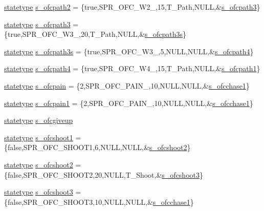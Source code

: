 \begin{DoxyCompactItemize}
\item 
\hyperlink{structstatestruct}{statetype} \hyperlink{WL__ACT2_8C_a90e98fd84e585f813ddd1a343605cacc}{s\_\-ofcpath2} = \{true,SPR\_\-OFC\_\-W2\_,15,T\_\-Path,NULL,\&\hyperlink{WL__ACT2_8C_af823cd8629d121bbcd71e39e9dd61bf6}{s\_\-ofcpath3}\}
\item 
\hyperlink{structstatestruct}{statetype} \hyperlink{WL__ACT2_8C_af823cd8629d121bbcd71e39e9dd61bf6}{s\_\-ofcpath3} = \{true,SPR\_\-OFC\_\-W3\_,20,T\_\-Path,NULL,\&\hyperlink{WL__ACT2_8C_a6601566ef7b73539b95e3bdc9d8de72f}{s\_\-ofcpath3s}\}
\item 
\hyperlink{structstatestruct}{statetype} \hyperlink{WL__ACT2_8C_a6601566ef7b73539b95e3bdc9d8de72f}{s\_\-ofcpath3s} = \{true,SPR\_\-OFC\_\-W3\_,5,NULL,NULL,\&\hyperlink{WL__ACT2_8C_a3b37f3a468ab697ce571f0ec399c8386}{s\_\-ofcpath4}\}
\item 
\hyperlink{structstatestruct}{statetype} \hyperlink{WL__ACT2_8C_a3b37f3a468ab697ce571f0ec399c8386}{s\_\-ofcpath4} = \{true,SPR\_\-OFC\_\-W4\_,15,T\_\-Path,NULL,\&\hyperlink{WL__ACT2_8C_a29992c9719ce8a66a95f69e0833eeb07}{s\_\-ofcpath1}\}
\item 
\hyperlink{structstatestruct}{statetype} \hyperlink{WL__ACT2_8C_acd795aa968a47e77109d917e6539e2b1}{s\_\-ofcpain} = \{2,SPR\_\-OFC\_\-PAIN\_,10,NULL,NULL,\&\hyperlink{WL__DEF_8H_a44b7e077d3373fd8075bb6acdcfcd0df}{s\_\-ofcchase1}\}
\item 
\hyperlink{structstatestruct}{statetype} \hyperlink{WL__ACT2_8C_aa5e50151f6cdf0e49996440f74ad691d}{s\_\-ofcpain1} = \{2,SPR\_\-OFC\_\-PAIN\_,10,NULL,NULL,\&\hyperlink{WL__DEF_8H_a44b7e077d3373fd8075bb6acdcfcd0df}{s\_\-ofcchase1}\}
\item 
\hyperlink{structstatestruct}{statetype} \hyperlink{WL__ACT2_8C_a8bf52496d133d46dd7ec3ab0f367a44f}{s\_\-ofcgiveup}
\item 
\hyperlink{structstatestruct}{statetype} \hyperlink{WL__ACT2_8C_a5423e1b82c361ca71a288cbd7b071c1a}{s\_\-ofcshoot1} = \{false,SPR\_\-OFC\_\-SHOOT1,6,NULL,NULL,\&\hyperlink{WL__ACT2_8C_a8df7d062c99ab885343b17ebcc53df1b}{s\_\-ofcshoot2}\}
\item 
\hyperlink{structstatestruct}{statetype} \hyperlink{WL__ACT2_8C_a8df7d062c99ab885343b17ebcc53df1b}{s\_\-ofcshoot2} = \{false,SPR\_\-OFC\_\-SHOOT2,20,NULL,T\_\-Shoot,\&\hyperlink{WL__ACT2_8C_aa6111d890bf4a25175072559ff7afc10}{s\_\-ofcshoot3}\}
\item 
\hyperlink{structstatestruct}{statetype} \hyperlink{WL__ACT2_8C_aa6111d890bf4a25175072559ff7afc10}{s\_\-ofcshoot3} = \{false,SPR\_\-OFC\_\-SHOOT3,10,NULL,NULL,\&\hyperlink{WL__DEF_8H_a44b7e077d3373fd8075bb6acdcfcd0df}{s\_\-ofcchase1}\}

\end{DoxyCompactItemize}
